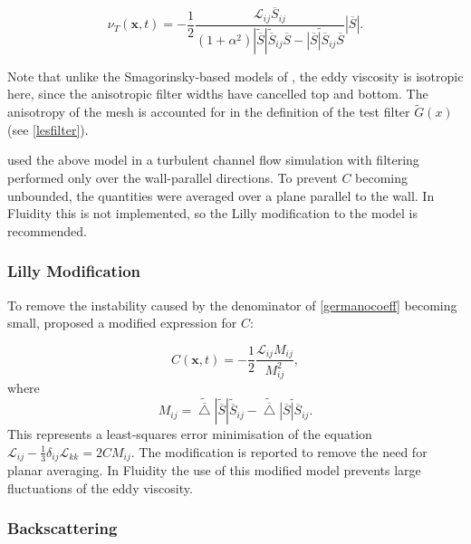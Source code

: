 \begin{equation}\label{germanovisc}
\nu_T(\mathbf x, t) = - \frac{1}{2} \frac{\mathcal L_{ij} \overline S_{ij}}
{(1+\alpha^2) | \widetilde{\overline S} | \widetilde{\overline S}_{ij} \overline S -
\widetilde{ | \overline S | \overline S_{ij}} \overline S}
\left | \overline S \right |.
\end{equation}

Note that unlike the Smagorinsky-based models of \citet{bentham2003}, the eddy viscosity is isotropic here, since the anisotropic filter widths have cancelled top and bottom. The anisotropy of the mesh is accounted for in the definition of the test filter $\widetilde G(x)$ (see \ref{lesfilter}).

\citet{germano1991} used the above model in a turbulent channel flow simulation with filtering performed only over the wall-parallel directions. To prevent $C$ becoming unbounded, the quantities were averaged over a plane parallel to the wall. In Fluidity this is not implemented, so the Lilly modification to the model is recommended.

\subsubsection{Lilly Modification}

To remove the instability caused by the denominator of \eqref{germanocoeff} becoming small, \citet{lilly1991} proposed a modified expression for $C$:

\begin{equation}\label{lillycoeff}
C(\mathbf x, t) = - \frac{1}{2} \frac{\mathcal L_{ij} M_{ij}}{M^2_{ij}},
\end{equation}
where
\begin{equation}
M_{ij} = {\widetilde{\overline \bigtriangleup} | \widetilde{\overline S} | \widetilde{\overline S}_{ij} -
\widetilde{\overline \bigtriangleup} \widetilde{ | \overline S | \overline S_{ij}}}.
\end{equation}
This represents a least-squares error minimisation of the equation $\mathcal L_{ij} - \frac 1 3 \delta_{ij} \mathcal L_{kk} = 2CM_{ij}$. The modification is reported to remove the need for planar averaging. In Fluidity the use of this modified model prevents large fluctuations of the eddy viscosity.


\subsubsection{Backscattering}

